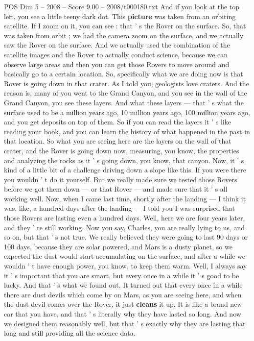 \begin{textsample}{POS Dim 5 – 2008 – Score 9.00 – 2008/t000180.txt}
And if you look at the top left, you see a little teeny dark dot.
This \textbf{picture} was taken from an orbiting satellite.
If I zoom on it, you can see : that ' s the Rover on the surface.
So, that was taken from orbit ; we had the camera zoom on the surface, and we actually saw the Rover on the surface.
And we actually used the combination of the satellite images and the Rover to actually conduct science, because we can observe large areas and then you can get those Rovers to move around and basically go to a certain location.
So, specifically what we are doing now is that Rover is going down in that crater.
As I told you, geologists love craters.
And the reason is, many of you went to the Grand Canyon, and you see in the wall of the Grand Canyon, you see these layers.
And what these layers — that ' s what the surface used to be a million years ago, 10 million years ago, 100 million years ago, and you get deposits on top of them.
So if you can read the layers it ' s like reading your book, and you can learn the history of what happened in the past in that location.
So what you are seeing here are the layers on the wall of that crater, and the Rover is going down now, measuring, you know, the properties and analyzing the rocks as it ' s going down, you know, that canyon.
Now, it ' s kind of a little bit of a challenge driving down a slope like this.
If you were there you wouldn ' t do it yourself.
But we really made sure we tested those Rovers before we got them down — or that Rover — and made sure that it ' s all working well.
Now, when I came last time, shortly after the landing — I think it was, like, a hundred days after the landing — I told you I was surprised that those Rovers are lasting even a hundred days.
Well, here we are four years later, and they ' re still working.
Now you say, Charles, you are really lying to us, and so on, but that ' s not true.
We really believed they were going to last 90 days or 100 days, because they are solar powered, and Mars is a dusty planet, so we expected the dust would start accumulating on the surface, and after a while we wouldn ' t have enough power, you know, to keep them warm.
Well, I always say it ' s important that you are smart, but every once in a while it ' s good to be lucky.
And that ' s what we found out.
It turned out that every once in a while there are dust devils which come by on Mars, as you are seeing here, and when the dust devil comes over the Rover, it just \textbf{cleans} it up.
It is like a brand new car that you have, and that ' s literally why they have lasted so long.
And now we designed them reasonably well, but that ' s exactly why they are lasting that long and still providing all the science data.

\end{textsample}
